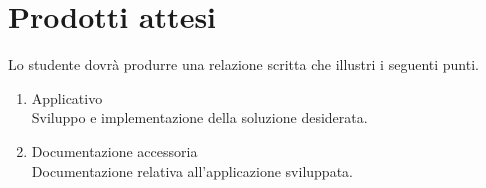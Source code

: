 \section*{Prodotti attesi}
Lo studente dovrà produrre una relazione scritta che illustri i seguenti punti.
\begin{enumerate}
    \item Applicativo\\
    Sviluppo e implementazione della soluzione desiderata. 
    
    \item Documentazione accessoria \\
    Documentazione relativa all'applicazione sviluppata.
\end{enumerate}
